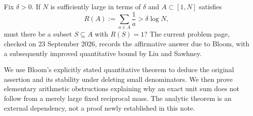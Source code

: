 Fix $\delta>0$. If $N$ is sufficiently large in terms of $\delta$ and
$A\subset[1,N]$ satisfies
\[
 R(A):=\sum_{a\in A}\frac1a>\delta\log N,
\]
must there be a subset $S\subseteq A$ with $R(S)=1$?
The current problem page, checked on 23 September 2026, records the
affirmative answer due to Bloom, with a subsequently improved
quantitative bound by Liu and Sawhney.

We use Bloom's explicitly stated quantitative theorem to deduce the
original assertion and its stability under deleting small denominators.
We then prove elementary arithmetic obstructions explaining why an
exact unit sum does not follow from a merely large fixed reciprocal
mass. The analytic theorem is an external dependency, not a proof
newly established in this note.
